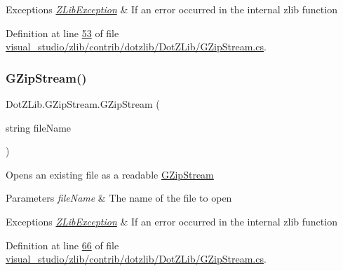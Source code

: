 \begin{DoxyExceptions}{Exceptions}
{\em \hyperlink{class_dot_z_lib_1_1_z_lib_exception}{Z\+Lib\+Exception}} & If an error occurred in the internal zlib function\\
\hline
\end{DoxyExceptions}


Definition at line \hyperlink{visual__studio_2zlib_2contrib_2dotzlib_2_dot_z_lib_2_g_zip_stream_8cs_source_l00053}{53} of file \hyperlink{visual__studio_2zlib_2contrib_2dotzlib_2_dot_z_lib_2_g_zip_stream_8cs_source}{visual\+\_\+studio/zlib/contrib/dotzlib/\+Dot\+Z\+Lib/\+G\+Zip\+Stream.\+cs}.

\mbox{\label{class_dot_z_lib_1_1_g_zip_stream_aea152a18b8cab1ee3d614fc3799c7e08}} 
\subsubsection{\texorpdfstring{G\+Zip\+Stream()}{GZipStream()}\hspace{0.1cm}{\footnotesize\ttfamily [2/4]}}
{\footnotesize\ttfamily Dot\+Z\+Lib.\+G\+Zip\+Stream.\+G\+Zip\+Stream (\begin{DoxyParamCaption}\item[{string}]{file\+Name }\end{DoxyParamCaption})\hspace{0.3cm}{\ttfamily [inline]}}



Opens an existing file as a readable \hyperlink{class_dot_z_lib_1_1_g_zip_stream}{G\+Zip\+Stream} 


\begin{DoxyParams}{Parameters}
{\em file\+Name} & The name of the file to open\\
\hline
\end{DoxyParams}

\begin{DoxyExceptions}{Exceptions}
{\em \hyperlink{class_dot_z_lib_1_1_z_lib_exception}{Z\+Lib\+Exception}} & If an error occurred in the internal zlib function\\
\hline
\end{DoxyExceptions}


Definition at line \hyperlink{visual__studio_2zlib_2contrib_2dotzlib_2_dot_z_lib_2_g_zip_stream_8cs_source_l00066}{66} of file \hyperlink{visual__studio_2zlib_2contrib_2dotzlib_2_dot_z_lib_2_g_zip_stream_8cs_source}{visual\+\_\+studio/zlib/contrib/dotzlib/\+Dot\+Z\+Lib/\+G\+Zip\+Stream.\+cs}.

